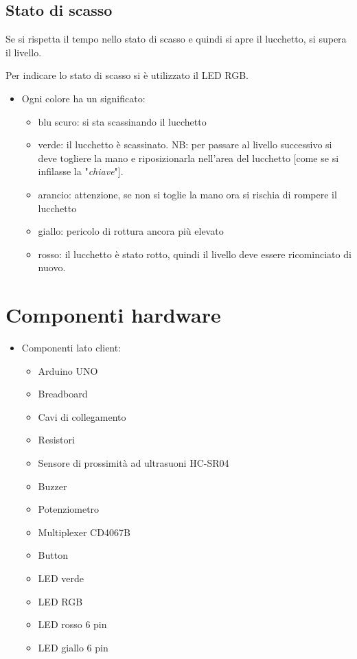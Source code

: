 \subsection{Stato di scasso}
Se si rispetta il tempo nello stato di scasso e quindi si apre il lucchetto, si supera il livello.

Per indicare lo stato di scasso si è utilizzato il LED RGB. 
\begin{itemize}
	\item Ogni colore ha un significato:
	\begin{itemize}
		\item blu scuro: si sta scassinando il lucchetto
		\item verde: il lucchetto è scassinato.
			\subitem NB: per passare al livello successivo si deve togliere la mano e riposizionarla nell'area del lucchetto [come se si infilasse la "\textit{chiave}"].
		\item arancio: attenzione, se non si toglie la mano ora si rischia di rompere il lucchetto
		\item giallo: pericolo di rottura ancora più elevato
		\item rosso: il lucchetto è stato rotto, quindi il livello deve essere ricominciato di nuovo.
	\end{itemize}
\end{itemize}


\section{Componenti hardware}
\begin{itemize}
	\item Componenti lato client:
		\begin{itemize}
		\item Arduino UNO
		\item Breadboard
		\item Cavi di collegamento
		\item Resistori
		\item Sensore di prossimità ad ultrasuoni HC-SR04
		\item Buzzer
		\item Potenziometro
		\item Multiplexer CD4067B
		\item Button
		\item LED verde
		\item LED RGB
		\item LED rosso 6 pin
		\item LED giallo 6 pin
	\end{itemize}
\end{itemize}

